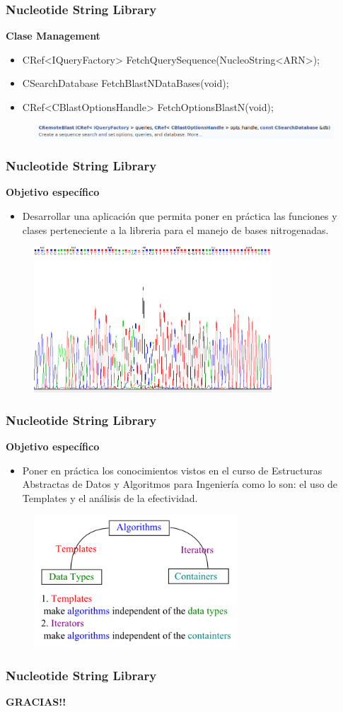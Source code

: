 \documentclass{beamer}
\begin{document}
\begin{frame}
\frametitle{Nucleotide String Library}
\textbf{\large{Clase Management}}
\begin{itemize}
\item{CRef<IQueryFactory> FetchQuerySequence(NucleoString<ARN>);}
\item{CSearchDatabase FetchBlastNDataBases(void);}
\item{CRef<CBlastOptionsHandle> FetchOptionsBlastN(void);}
\end{itemize}
\begin{figure}
		\includegraphics[width=4.7in]{remote.png}
\end{figure}
\end{frame}

\begin{frame}
\frametitle{Nucleotide String Library}
\textbf{\large{Objetivo específico}}
\begin{itemize}
\item Desarrollar una aplicación que permita poner en práctica las funciones y clases perteneciente a la libreria para el manejo de bases nitrogenadas.
\end{itemize}
\begin{figure}
		\includegraphics[width=3.5in]{2.png}
\end{figure}
\end{frame}

\begin{frame}
\frametitle{Nucleotide String Library}
\textbf{\large{Objetivo específico}}
\begin{itemize}
\item Poner en práctica los conocimientos vistos en el curso de Estructuras Abstractas de Datos y Algoritmos para Ingeniería como lo son: el uso de Templates y el análisis de la efectividad.
\end{itemize}
\begin{figure}
		\includegraphics[width=3.0in]{templates.png}
\end{figure}
\end{frame}

\begin{frame}
\frametitle{Nucleotide String Library}
\textbf{\large{GRACIAS!!}}
\end{frame}
\end{document}

